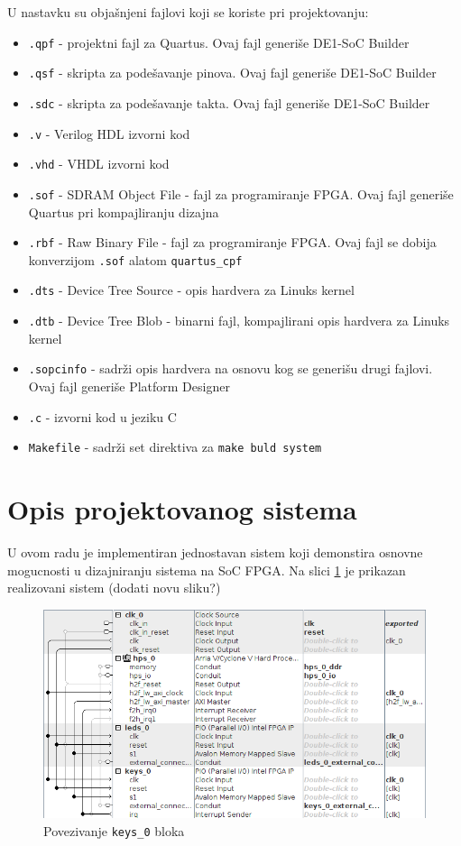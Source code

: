 U nastavku su objašnjeni fajlovi koji se koriste pri projektovanju:
\begin{itemize}
\item \texttt{.qpf} - projektni fajl za Quartus. Ovaj fajl generiše DE1-SoC Builder
\item \texttt{.qsf} - skripta za podešavanje pinova. Ovaj fajl generiše DE1-SoC Builder
\item \texttt{.sdc} - skripta za podešavanje takta. Ovaj fajl generiše DE1-SoC Builder
\item \texttt{.v} - Verilog HDL izvorni kod
\item \texttt{.vhd} - VHDL izvorni kod
\item \texttt{.sof} -  SDRAM Object File - fajl za programiranje FPGA.  Ovaj fajl generiše Quartus pri kompajliranju dizajna
\item \texttt{.rbf} - Raw Binary File - fajl za programiranje FPGA. Ovaj fajl se dobija konverzijom \texttt{.sof} alatom \texttt{quartus\_cpf}
\item \texttt{.dts} - Device Tree Source - opis hardvera za Linuks kernel
\item \texttt{.dtb} - Device Tree Blob - binarni fajl, kompajlirani opis hardvera za Linuks kernel
\item \texttt{.sopcinfo} - sadrži opis hardvera na osnovu kog se generišu drugi fajlovi. Ovaj fajl generiše Platform Designer
\item \texttt{.c} - izvorni kod u jeziku C
\item \texttt{Makefile} - sadrži set direktiva za \texttt{make buld system}
\end{itemize} 
\pagebreak
\section{Opis projektovanog sistema}

U ovom radu je implementiran jednostavan sistem koji demonstira osnovne mogucnosti u dizajniranju sistema na SoC FPGA. Na slici \ref{slika:q3} je prikazan realizovani sistem (dodati novu sliku?)

\begin{figure}[h!]
\centering
\includegraphics[scale=0.9]{img/quartus3.png}
\caption{Povezivanje \texttt{keys\_0} bloka}
\label{slika:q3}
\end{figure}
